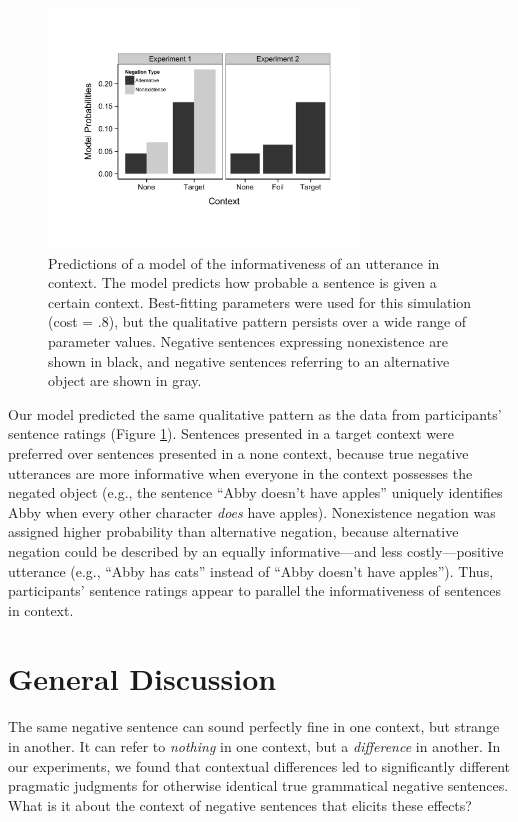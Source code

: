 \documentclass[10pt,letterpaper]{article}
\begin{document}
\begin{figure}[t]
\begin{center} 
\includegraphics[width=3.25in]{figures/model_predictions.pdf}
\caption{\label{fig:model} Predictions of a model of the informativeness of an utterance in context.  The model predicts how probable a sentence is given a certain context.  Best-fitting parameters were used for this simulation (cost = .8), but the qualitative pattern persists over a wide range of parameter values.  Negative sentences expressing nonexistence are shown in black, and negative sentences referring to an alternative object are shown in gray.}
\end{center} 
\end{figure}

Our model predicted the same qualitative pattern as the data from participants' sentence ratings (Figure \ref{fig:model}).  Sentences presented in a target context were preferred over sentences presented in a none context, because true negative utterances are more informative when everyone in the context possesses the negated object (e.g., the sentence ``Abby doesn't have apples'' uniquely identifies Abby when every other character \emph{does} have apples).  Nonexistence negation was assigned higher probability than alternative negation, because alternative negation could be described by an equally informative---and less costly---positive utterance (e.g., ``Abby has cats'' instead of ``Abby doesn't have apples'').  Thus, participants' sentence ratings appear to parallel the informativeness of sentences in context.  

\section{General Discussion}

The same negative sentence can sound perfectly fine in one context, but strange in another.  It can refer to \emph{nothing} in one context, but a \emph{difference} in another. In our experiments, we found that contextual differences led to significantly different pragmatic judgments for otherwise identical true grammatical negative sentences.  What is it about the context of negative sentences that elicits these effects?  
\end{document}
